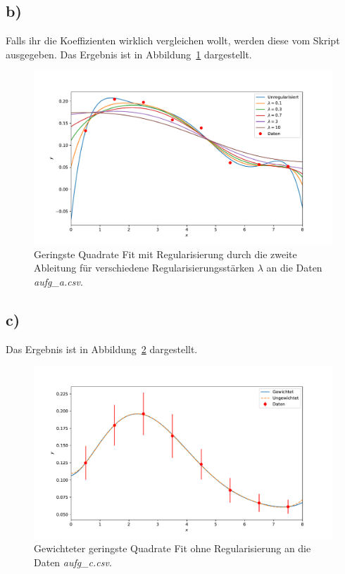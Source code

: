 \documentclass[a4paper, 11pt]{article}
\begin{document}
\subsection*{b)}
Falls ihr die Koeffizienten wirklich vergleichen wollt, werden diese vom Skript ausgegeben. Das Ergebnis ist in Abbildung~\ref{fig:31b} dargestellt.
\begin{figure}
    \centering
    \includegraphics[width=\textwidth]{../A31/A31b.pdf}
    \caption{Geringste Quadrate Fit mit Regularisierung durch die zweite Ableitung für verschiedene Regularisierungsstärken $\lambda$ an die Daten \textit{aufg\_a.csv}.}
    \label{fig:31b}
\end{figure}
\FloatBarrier

\subsection*{c)}
Das Ergebnis ist in Abbildung~\ref{fig:31c} dargestellt.
\begin{figure}
    \centering
    \includegraphics[width=\textwidth]{../A31/A31c.pdf}
    \caption{Gewichteter geringste Quadrate Fit ohne Regularisierung an die Daten \textit{aufg\_c.csv}.}
    \label{fig:31c}
\end{figure}
\end{document}
